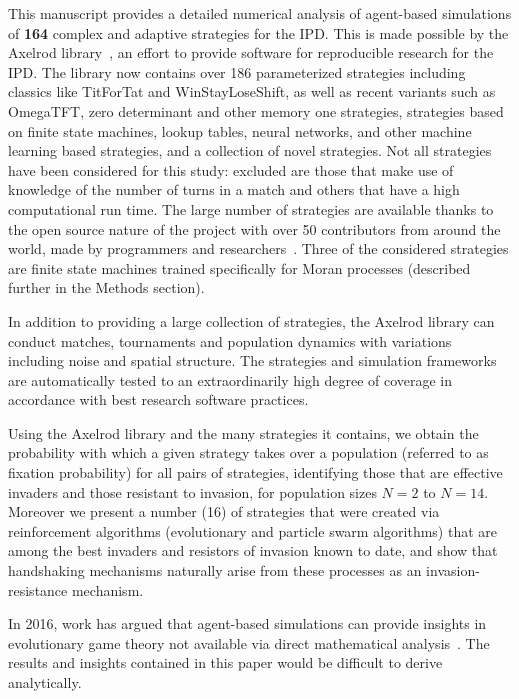 \documentclass[10pt,letterpaper]{article}
\begin{document}
This manuscript provides a detailed numerical analysis of agent-based simulations
of \textbf{164} complex and adaptive strategies for the
IPD\@. This is made possible by the Axelrod library~\cite{axelrodproject}, an
effort to provide software for reproducible research for the IPD\@. The library
now contains over 186 parameterized
strategies including classics like TitForTat and WinStayLoseShift, as well as
recent variants such as OmegaTFT, zero determinant and other memory one
strategies, strategies based on finite state machines, lookup tables, neural
networks, and other machine learning based strategies, and a collection of novel
strategies. Not all strategies have been considered for this study: excluded
are those that make use of knowledge of the number of turns in a match
and others that have a high
computational run time. The large number of strategies are available thanks to
the open source nature of the project with over 50 contributors from around the
world, made by programmers and researchers~\cite{Knight2016}. Three of the considered
strategies are finite state machines trained specifically for Moran processes
(described further in the Methods section).

In addition to providing a large collection of strategies, the Axelrod library
can conduct matches, tournaments and population
dynamics with variations including noise and spatial structure.
The strategies and simulation frameworks are
automatically tested to an extraordinarily high degree of coverage in accordance
with best research software practices.

Using the Axelrod library and the many strategies it contains, we obtain the
probability with which a given strategy takes over a population (referred to as
fixation probability) for all pairs of strategies, identifying those that are
effective invaders and those resistant to invasion, for population sizes $N=2$
to $N=14$. Moreover we present a number (16) of strategies that were created via
reinforcement algorithms (evolutionary and particle swarm algorithms) that are
among the best invaders and resistors of invasion known to date, and show that
handshaking mechanisms naturally arise from these processes as an
invasion-resistance mechanism.

In 2016, work has argued that agent-based
simulations can provide insights in evolutionary game theory not available
via direct mathematical analysis~\cite{adami2016evolutionary}. The results
and insights contained in this paper would be difficult to derive analytically.
\end{document}
